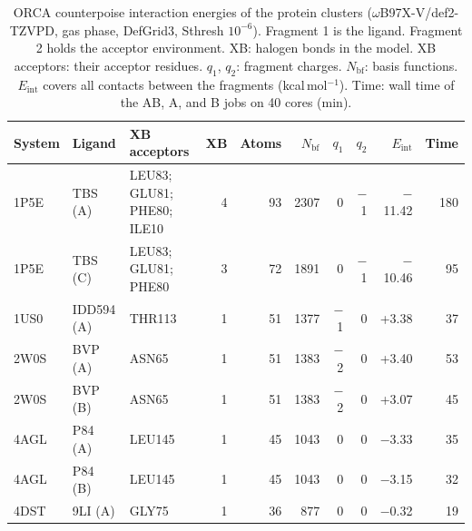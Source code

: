\begin{table}[!htbp]\centering\footnotesize
\caption{ORCA counterpoise interaction energies of the protein clusters ($\omega$B97X-V/def2-TZVPD, gas phase, DefGrid3, Sthresh $10^{-6}$). Fragment 1 is the ligand. Fragment 2 holds the acceptor environment. XB: halogen bonds in the model. XB acceptors: their acceptor residues. $q_1$, $q_2$: fragment charges. $N_\mathrm{bf}$: basis functions. $E_\mathrm{int}$ covers all contacts between the fragments (kcal\,mol$^{-1}$). Time: wall time of the AB, A, and B jobs on 40 cores (min).}\label{tab:cpprot}
\begin{tabular}{lllrrrrrrr}\toprule System & Ligand & XB acceptors & XB & Atoms & $N_\mathrm{bf}$ & $q_1$ & $q_2$ & $E_\mathrm{int}$ & Time\\\midrule
1P5E & TBS (A) & LEU83; GLU81; PHE80; ILE10 & 4 & 93 & 2307 & 0 & $-$1 & $-$11.42 & 180\\
1P5E & TBS (C) & LEU83; GLU81; PHE80 & 3 & 72 & 1891 & 0 & $-$1 & $-$10.46 & 95\\
1US0 & IDD594 (A) & THR113 & 1 & 51 & 1377 & $-$1 & 0 & +3.38 & 37\\
2W0S & BVP (A) & ASN65 & 1 & 51 & 1383 & $-$2 & 0 & +3.40 & 53\\
2W0S & BVP (B) & ASN65 & 1 & 51 & 1383 & $-$2 & 0 & +3.07 & 45\\
4AGL & P84 (A) & LEU145 & 1 & 45 & 1043 & 0 & 0 & $-$3.33 & 35\\
4AGL & P84 (B) & LEU145 & 1 & 45 & 1043 & 0 & 0 & $-$3.15 & 32\\
4DST & 9LI (A) & GLY75 & 1 & 36 & 877 & 0 & 0 & $-$0.32 & 19\\
\bottomrule\end{tabular}\end{table}
